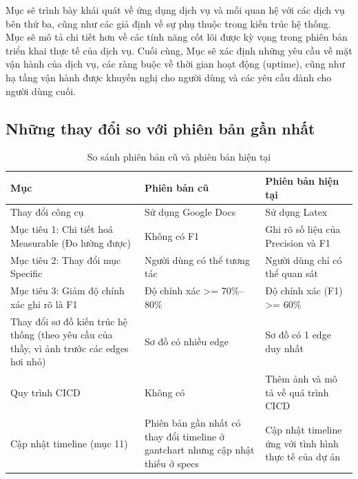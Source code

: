 \quad Mục  sẽ trình bày khái quát về ứng dụng dịch vụ và mối quan hệ với các dịch vụ bên thứ ba, cũng như các giả định về sự phụ thuộc trong kiến trúc hệ thống. Mục  sẽ mô tả chi tiết hơn về các tính năng cốt lõi được kỳ vọng trong phiên bản triển khai thực tế của dịch vụ.
Cuối cùng, Mục  sẽ xác định những yêu cầu về mặt vận hành của dịch vụ, các ràng buộc về thời gian hoạt động (uptime), cũng như hạ tầng vận hành được khuyến nghị cho người dùng và các yêu cầu dành cho người dùng cuối.

\subsection{Những thay đổi so với phiên bản gần nhất}
\begin{table}[H]
    \centering
    \caption{So sánh phiên bản cũ và phiên bản hiện tại}
    \begin{tabular}{|p{4cm}|p{6cm}|p{6cm}|}
    \hline
    \textbf{Mục} & \textbf{Phiên bản cũ} & \textbf{Phiên bản hiện tại} \\ \hline
    Thay đổi công cụ & Sử dụng Google Docs & Sử dụng Latex \\ \hline
    Mục tiêu 1: Chi tiết hoá Measurable (Đo lường được) & Không có F1 & Ghi rõ số liệu của Precision và F1 \\ \hline
    Mục tiêu 2: Thay đổi mục Specific & Người dùng có thể tương tác & Người dùng chỉ có thể quan sát \\ \hline
    Mục tiêu 3: Giảm độ chính xác ghi rõ là F1 &  Độ chính xác >= 70\%–80\%  & Độ chính xác (F1) >= 60\%  \\ \hline
    Thay đổi sơ đồ kiến trúc hệ thống (theo yêu cầu của thầy, vì ảnh trước các edges hơi nhỏ) & Sơ đồ có nhiều edge & Sơ đồ có 1 edge duy nhất \\ \hline
    Quy trình CICD & Không có & Thêm ảnh và mô tả về quá trình CICD \\ \hline
    Cập nhật timeline (mục 11) & Phiên bản gần nhất có thay đổi timeline ở gantchart nhưng cập nhật thiếu ở specs & Cập nhật timeline ứng với tình hình thực tế của dự án\\ \hline
    \end{tabular}
\end{table}





\pagebreak